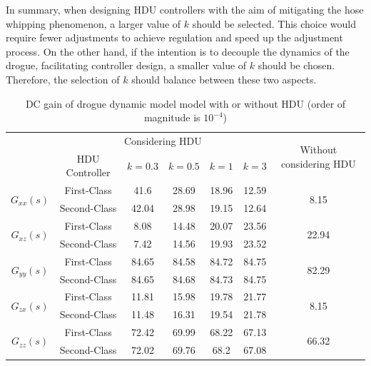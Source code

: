 In summary, when designing HDU controllers with the aim of mitigating the hose whipping phenomenon, a larger value of $k$ should be selected. This choice would require fewer adjustments to achieve regulation and speed up the adjustment process. On the other hand, if the intention is to decouple the dynamics of the drogue, facilitating controller design, a smaller value of $k$ should be chosen. Therefore, the selection of $k$ should balance between these two aspects.

\begin{table}[htbp]
	\centering
	\caption{DC gain of drogue dynamic model model with or without HDU (order of magnitude is $10^{-4}$)}
	\begin{tabular}{|c|c|c|c|c|c|c|}
		\hline \multirow{2}[0]{*}{\diagbox{Transfer function}{Drogue model type}} & \multicolumn{5}{c|}{Considering HDU}             & \multirow{2}[0]{*}{Without considering HDU} \\ \cline{2-6}
		& HDU Controller & $k = 0.3$     & $k = 0.5$     & $k = 1$     & $k = 3$     &  \\ \hline
		\multirow{2}[0]{*}{ ${G_{xx}}\left( s \right)$}     & First-Class   & 41.6  & 28.69 & 18.96 & 12.59 &  \multirow{2}[0]{*}{8.15} \\ \cline{2-6}
		& Second-Class   & 42.04 & 28.98 & 19.15 & 12.64 &  \\ \hline
		\multirow{2}[0]{*}{ ${G_{xz}}\left( s \right)$}     & First-Class   & 8.08  & 14.48 & 20.07 & 23.56 & \multirow{2}[0]{*}{22.94} \\ \cline{2-6}
		& Second-Class   & 7.42  & 14.56 & 19.93 & 23.52 &  \\ \hline
		\multirow{2}[0]{*}{ ${G_{yy}}\left( s \right)$}     & First-Class   & 84.65 & 84.58 & 84.72 & 84.75 & \multirow{2}[0]{*}{82.29} \\ \cline{2-6}
		& Second-Class   & 84.65 & 84.68 & 84.73 & 84.75 &  \\ \hline
		\multirow{2}[0]{*}{ ${G_{zx}}\left( s \right)$}     & First-Class   & 11.81 & 15.98 & 19.78 & 21.77 & \multirow{2}[0]{*}{8.15} \\ \cline{2-6}
		& Second-Class   & 11.48 & 16.31 & 19.54 & 21.78 &  \\ \hline
		\multirow{2}[0]{*}{ ${G_{zz}}\left( s \right)$}     & First-Class   & 72.42 & 69.99 & 68.22 & 67.13 & \multirow{2}[0]{*}{66.32} \\ \cline{2-6}
		& Second-Class   & 72.02 & 69.76 & 68.2  & 67.08 &  \\ \hline
	\end{tabular}%
	\label{tab4.7}%
\end{table}%


